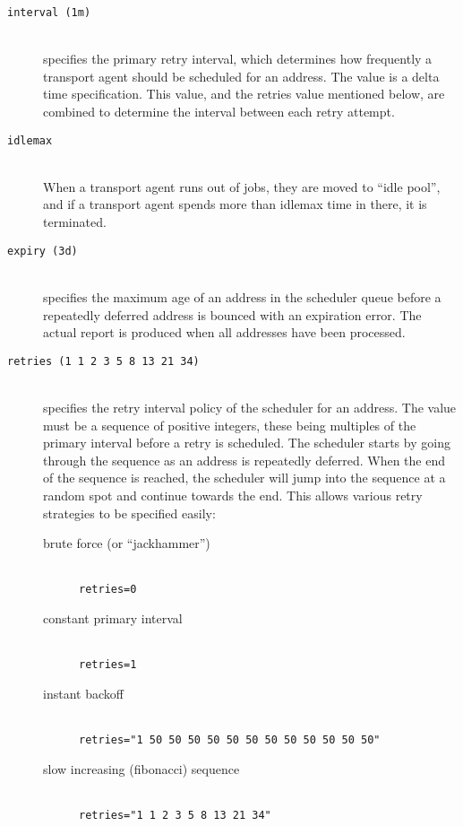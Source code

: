 \begin{description}

\item[\tt interval \rm(1m)] \mbox{} \\
specifies the primary retry interval, which determines how frequently a 
transport agent should be scheduled for an address. The value is a delta
time specification. This value, and the retries value mentioned below, 
are combined to determine the interval between each retry attempt.

\item[\tt idlemax] \mbox{} \\
When a transport agent runs out of jobs, they are moved
to ``idle pool'', and if a transport agent spends more than idlemax
time in there, it is terminated.

\item[\tt expiry \rm(3d)] \mbox{} \\
specifies  the  maximum age of an address in the scheduler 
queue before  a repeatedly  deferred  address  is
bounced with an expiration error.  The actual report is
produced when all addresses have been processed.

\item[\tt retries \rm(1 1 2 3 5 8 13 21 34)] \mbox{} \\
specifies the retry interval policy  of the scheduler 
for an address. The value must be a sequence of positive integers, these 
being multiples of the primary interval  before  a  retry is scheduled. 
The scheduler starts by going through the sequence as an  address  is 
repeatedly deferred. When the end of the sequence is reached, the scheduler 
will jump into the sequence at a random  spot and continue towards the end.  
This allows various retry strategies to be specified easily:

\begin{description}
\item[\rm brute force (or ``jackhammer'')]\mbox{} \\
{\tt  retries=0 }

\item[\rm constant primary interval]\mbox{}\\
{\tt  retries=1 }

\item[\rm instant backoff]\mbox{}\\
{\tt  retries="1 50 50 50 50 50 50 50 50 50 50 50 50" }

\item[\rm slow increasing (fibonacci) sequence]\mbox{}\\
{\tt  retries="1 1 2 3 5 8 13 21 34" }


\end{description}
\end{description}

